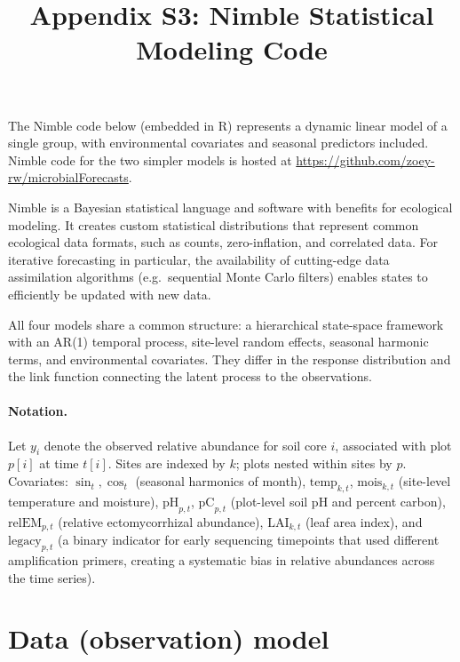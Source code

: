 \documentclass[11pt]{article}
\title{Appendix S3: Nimble Statistical Modeling Code}
\author{}
\date{}
\begin{document}
\maketitle

The Nimble code below (embedded in R) represents a dynamic linear model of a single group, with environmental covariates and seasonal predictors included. Nimble code for the two simpler models is hosted at \url{https://github.com/zoey-rw/microbialForecasts}.

Nimble is a Bayesian statistical language and software with benefits for ecological modeling. It creates custom statistical distributions that represent common ecological data formats, such as counts, zero-inflation, and correlated data. For iterative forecasting in particular, the availability of cutting-edge data assimilation algorithms (e.g.\ sequential Monte Carlo filters) enables states to efficiently be updated with new data.

All four models share a common structure: a hierarchical state-space framework with an AR(1) temporal process, site-level random effects, seasonal harmonic terms, and environmental covariates. They differ in the response distribution and the link function connecting the latent process to the observations.

\paragraph{Notation.}
Let $y_{i}$ denote the observed relative abundance for soil core $i$, associated with plot $p[i]$ at time $t[i]$.
Sites are indexed by $k$; plots nested within sites by $p$.
Covariates: $\sin_t, \cos_t$ (seasonal harmonics of month), $\mathrm{temp}_{k,t}$, $\mathrm{mois}_{k,t}$ (site-level temperature and moisture), $\mathrm{pH}_{p,t}$, $\mathrm{pC}_{p,t}$ (plot-level soil pH and percent carbon), $\mathrm{relEM}_{p,t}$ (relative ectomycorrhizal abundance), $\mathrm{LAI}_{k,t}$ (leaf area index), and $\mathrm{legacy}_{p,t}$ (a binary indicator for early sequencing timepoints that used different amplification primers, creating a systematic bias in relative abundances across the time series).


\section{Data (observation) model}
\end{document}
